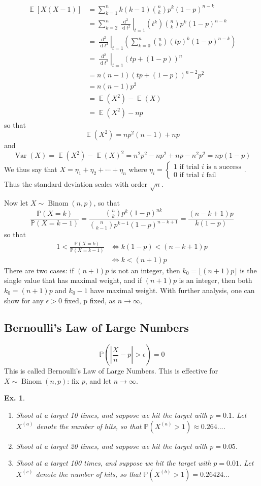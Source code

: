 \documentclass[12pt, a4paper]{book}
\DeclareMathOperator{\E}{\mathbb{E}}
\DeclareMathOperator{\Binom}{Binom}
\DeclareMathOperator{\Var}{Var}
\renewcommand{\Pr}{\mathbb{P}}
\renewcommand{\d}[1]{\ensuremath{\operatorname{d}\!{#1}}} %
\newtheorem{example}[theorem]{Ex.}
\theoremstyle{nonumberplain}
\begin{document}
\begin{align*}
    \E[X(X-1)] &= \sum\limits_{k=1}^n k(k-1)\binom{n}{k}p^k(1-p)^{n-k}\\
               &= \sum\limits_{k=2}^n\left.\frac{\d{}^2}{\d{t^2}}\right\rvert_{t=1}(t^k)\binom{n}{k}p^k(1-p)^{n-k}\\
               &=\left.\frac{\d{}^2}{\d{t^2}}\right\rvert_{t=1}\left(\sum\limits_{k=0}^n\binom{n}{k}(tp)^k(1-p)^{n-k}\right)\\
               &= \left.\frac{\d{}^2}{\d{t^2}}\right\rvert_{t=1}(tp+(1-p))^n\\
               &= n(n-1)(tp+(1-p))^{n-2}p^2\\
               &= n(n-1)p^2\\
               &= \E(X^2)-\E(X)\\
               &= \E(X^2)-np
\end{align*}
so that
\[\E(X^2)=np^2(n-1)+np\]
and
\[\Var(X)=\E(X^2)-\E(X)^2=n^2p^2-np^2+np-n^2p^2=np(1-p)\]
We thus say that $X=\eta_1+\eta_2+\cdots+\eta_n$ where $\eta_i=\begin{cases}1\text{ if trial $i$ is a success}\\0\text{ if trial $i$ fail}\end{cases}$.
Thus the standard deviation scales with order $\sqrt{n}$.

Now let $X\sim\Binom(n,p)$, so that
\[\frac{\Pr(X=k)}{\Pr(X=k-1)}=\frac{\binom{n}{k}p^k(1-p)^{nk}}{\binom{n}{k-1}p^{k-1}(1-p)^{n-k+1}}=\frac{(n-k+1)p}{k(1-p)}\]
so that
\begin{align*}
    1 <\frac{\Pr(X=k)}{\Pr(X=k-1)} &\Leftrightarrow k(1-p)<(n-k+1)p\\
                                   &\Leftrightarrow k<(n+1)p
\end{align*}
There are two cases: if $(n+1)p$ is not an integer, then $k_0=\lfloor(n+1)p\rfloor$ is the single value that has maximal weight, and if $(n+1)p$ is an integer, then both $k_0=(n+1)p$ and $k_0-1$ have maximal weight.
With further analysis, one can show for any $\epsilon>0$ fixed, p fixed, as $n\to\infty$,
\subsection{Bernoulli's Law of Large Numbers}
\[\Pr\left(\left\lvert\frac{X}{n}-p\right\rvert>\epsilon\right)=0\]
This is called Bernoulli's Law of Large Numbers.
This is effective for $X\sim\Binom(n,p)$: fix $p$, and let $n\to\infty$.
\begin{example}
    \begin{enumerate}[label=(\alph*)]
        \item Shoot at a target 10 times, and suppose we hit the target with $p=0.1$.
            Let $X^{(a)}$ denote the number of hits, so that $\Pr(X^{(a)}>1)\approx 0.264\ldots$.
        \item Shoot at a target 20 times, and suppose we hit the target with $p=0.05$.
        \item Shoot at a target 100 times, and suppose we hit the target with $p=0.01$.
            Let $X^{(c)}$ denote the number of hits, so that $\Pr(X^{(b)}>1)=0.26424\ldots$
    \end{enumerate}
\end{example}
\end{document}
